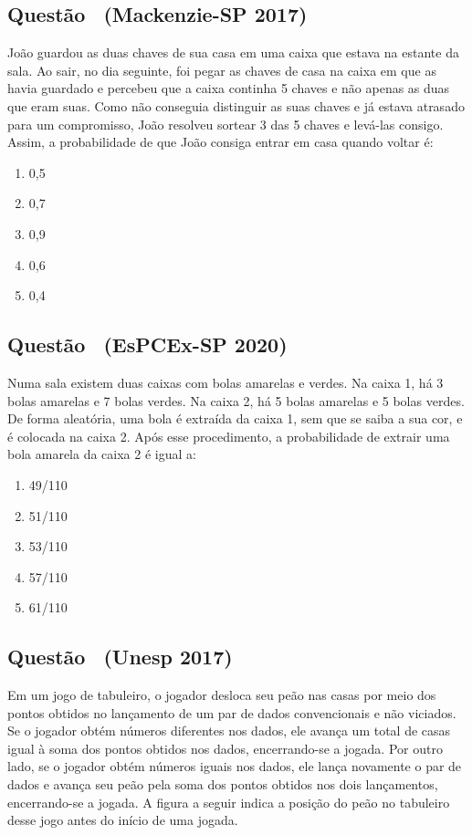 \documentclass[12pt]{article}
\newcounter{questao}
\newcommand{\novaquestao}[1]{%
  \stepcounter{questao}%
  \subsection*{Questão \thequestao\ (#1)}%
}
\begin{document}
\begin{multicols}{2}
        
        
        \novaquestao{Mackenzie-SP 2017}
            
            João guardou as duas chaves de sua casa em uma caixa que estava na estante 
            da sala. Ao sair, no dia seguinte, foi pegar as chaves de casa na caixa em 
            que as havia guardado e percebeu que a caixa continha 5 chaves e não apenas as 
            duas que eram suas. Como não conseguia distinguir as suas chaves e já estava 
            atrasado para um compromisso, João resolveu sortear 3 das 5 chaves e levá-las 
            consigo. Assim, a probabilidade de que João consiga entrar em casa quando 
            voltar é:

            \begin{enumerate}[label=(\alph*), noitemsep]
                \item 0,5
                \item 0,7
                \item 0,9
                \item 0,6
                \item 0,4
            \end{enumerate}
        
        \novaquestao{EsPCEx-SP 2020}

            Numa sala existem duas caixas com bolas amarelas e verdes. Na caixa 1, há 3 
            bolas amarelas e 7 bolas verdes. Na caixa 2, há 5 bolas amarelas e 5 bolas 
            verdes. De forma aleatória, uma bola é extraída da caixa 1, sem que se saiba 
            a sua cor, e é colocada na caixa 2. Após esse procedimento, a probabilidade 
            de extrair uma bola amarela da caixa 2 é igual a:

            \begin{enumerate}[label=(\alph*), noitemsep]
                \item {49}/{110}
                \item {51}/{110}
                \item {53}/{110}
                \item {57}/{110}
                \item {61}/{110}
            \end{enumerate}
        
        \novaquestao{Unesp 2017}

            Em um jogo de tabuleiro, o jogador desloca seu peão nas casas por meio dos pontos 
            obtidos no lançamento de um par de dados convencionais e não viciados. Se o jogador
            obtém números diferentes nos dados, ele avança um total de casas igual à soma dos
            pontos obtidos nos dados, encerrando-se a jogada. Por outro lado, se o jogador 
            obtém números iguais nos dados, ele lança novamente o par de dados e avança seu 
            peão pela soma dos pontos obtidos nos dois lançamentos, encerrando-se a jogada. A
            figura a seguir indica a posição do peão no tabuleiro desse jogo antes do início 
            de uma jogada.


\end{multicols}
\end{document}
